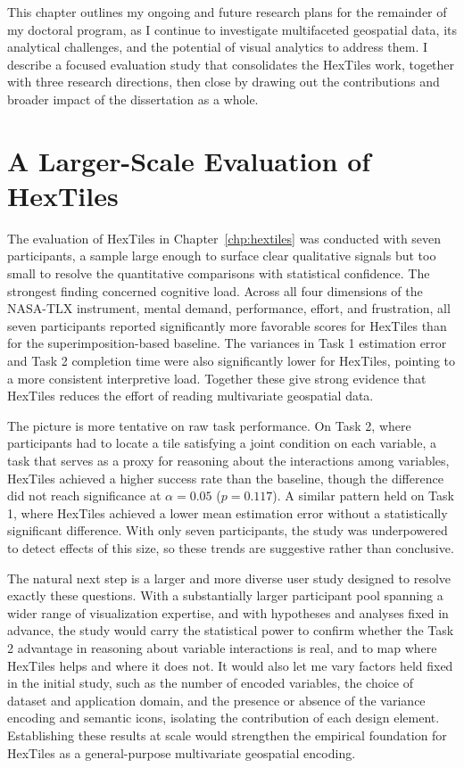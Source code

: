 This chapter outlines my ongoing and future research plans for the remainder of my doctoral program, as I continue to investigate multifaceted geospatial data, its analytical challenges, and the potential of visual analytics to address them. I describe a focused evaluation study that consolidates the HexTiles work, together with three research directions, then close by drawing out the contributions and broader impact of the dissertation as a whole.

\section{A Larger-Scale Evaluation of HexTiles}
The evaluation of HexTiles in Chapter~\ref{chp:hextiles} was conducted with seven participants, a sample large enough to surface clear qualitative signals but too small to resolve the quantitative comparisons with statistical confidence.
%
The strongest finding concerned cognitive load. Across all four dimensions of the NASA-TLX instrument, mental demand, performance, effort, and frustration, all seven participants reported significantly more favorable scores for HexTiles than for the superimposition-based baseline. The variances in Task 1 estimation error and Task 2 completion time were also significantly lower for HexTiles, pointing to a more consistent interpretive load. Together these give strong evidence that HexTiles reduces the effort of reading multivariate geospatial data.

The picture is more tentative on raw task performance.
%
On Task 2, where participants had to locate a tile satisfying a joint condition on each variable, a task that serves as a proxy for reasoning about the interactions among variables, HexTiles achieved a higher success rate than the baseline, though the difference did not reach significance at $\alpha = 0.05$ ($p = 0.117$).
%
A similar pattern held on Task 1, where HexTiles achieved a lower mean estimation error without a statistically significant difference.
%
With only seven participants, the study was underpowered to detect effects of this size, so these trends are suggestive rather than conclusive.

The natural next step is a larger and more diverse user study designed to resolve exactly these questions.
%
With a substantially larger participant pool spanning a wider range of visualization expertise, and with hypotheses and analyses fixed in advance, the study would carry the statistical power to confirm whether the Task 2 advantage in reasoning about variable interactions is real, and to map where HexTiles helps and where it does not.
%
It would also let me vary factors held fixed in the initial study, such as the number of encoded variables, the choice of dataset and application domain, and the presence or absence of the variance encoding and semantic icons, isolating the contribution of each design element.
%
Establishing these results at scale would strengthen the empirical foundation for HexTiles as a general-purpose multivariate geospatial encoding.

